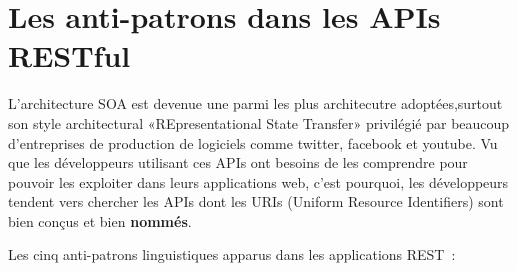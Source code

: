 \chapter{Les anti-patrons dans les APIs RESTful}
L’architecture SOA est devenue une parmi les plus architecutre adoptées,surtout son style architectural «REpresentational State Transfer» privilégié par beaucoup d’entreprises de production de logiciels comme twitter, facebook et youtube.
Vu que les développeurs utilisant ces APIs ont besoins de les comprendre pour pouvoir les exploiter dans leurs applications web, c’est pourquoi, les développeurs tendent vers chercher les APIs dont les URIs (Uniform Resource Identifiers) sont bien conçus et bien \textbf{nommés}.

Les cinq anti-patrons linguistiques  apparus dans les applications REST \cite{palma2015restful}:
